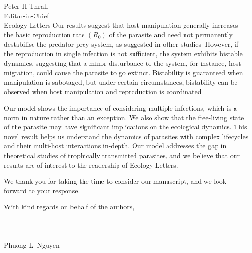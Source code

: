 \documentclass[10,DIN, pagenumber=false, parskip=half,fromalign=right, fromphone=false,fromemail=true, fromurl=false,fromlogo=true, fromrule=false]{scrlttr2}
\begin{document}
\begin{letter}{
\sffamily
\vspace{-0.4cm}
Peter H Thrall\\
Editor-in-Chief\\
Ecology Letters
}
Our results suggest that host manipulation generally increases the basic reproduction rate $(R_0)$ of the parasite and need not permanently destabilise the predator-prey system, as suggested in other studies.
However, if the reproduction in single infection is not sufficient, the system exhibits bistable dynamics, suggesting that a minor disturbance to the system, for instance, host migration, could cause the parasite to go extinct.
Bistability is guaranteed when manipulation is sabotaged, but under certain circumstances, bistability can be observed when host manipulation and reproduction is coordinated.

Our model shows the importance of considering multiple infections, which is a norm in nature rather than an exception. 
We also show that the free-living state of the parasite may have significant implications on the ecological dynamics.
This novel result helps us understand the dynamics of parasites with complex lifecycles and their multi-host interactions in-depth. 
Our model addresses the gap in theoretical studies of trophically transmitted parasites, and we believe that our results are of interest to the readership of Ecology Letters.

We thank you for taking the time to consider our manuscript, and we look forward to your response.

With kind regards on behalf of the authors,\\
\\
\\
\\
Phuong L. Nguyen

\end{letter}
\end{document}
